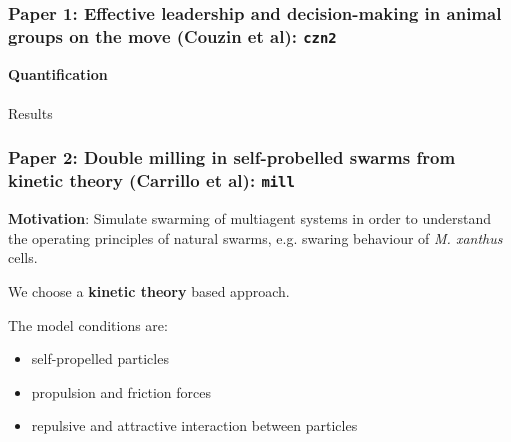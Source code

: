 \documentclass[compress]{beamer}
\begin{document}
\begin{frame}
	\frametitle{Paper 1: Effective leadership and decision-making in animal groups on the move (Couzin et al): \texttt{czn2}}
	
	\textbf{Quantification} \\ \\
	Results
	
\end{frame}


\begin{frame}
  \frametitle{Paper 2: Double milling in self-probelled swarms from kinetic theory (Carrillo et al): \texttt{mill}}
  
  \textbf{Motivation}: Simulate swarming of multiagent systems in order to understand the operating principles of natural swarms, e.g. swaring behaviour of \textit{M. xanthus} cells. \\ 

\hspace{3}

  We choose a \textbf{kinetic theory} based approach.\\

\hspace{3}

  The model conditions are:
  \begin{itemize}
  	\item self-propelled particles
  	\item propulsion and friction  forces
  	\item repulsive and attractive interaction between particles
  \end{itemize}
 
%


\end{frame}
\end{document}
